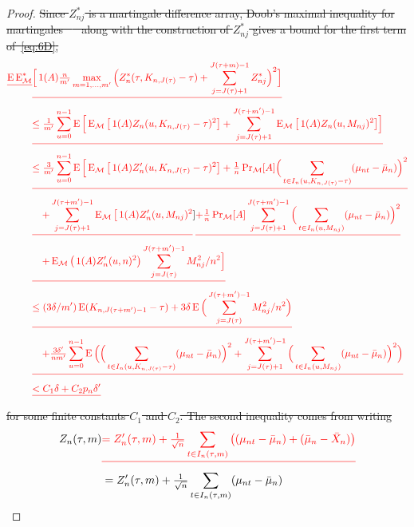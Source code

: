 \documentclass[11pt]{article}
\providecommand{\DIFadd}[1]{{\protect\color{blue}\uwave{#1}}} %
\providecommand{\DIFdel}[1]{{\protect\color{red}\sout{#1}}}                      %
\begin{document}
\begin{proof}
\DIFdel{Since $Z_{nj}^*$ is a martingale difference array, Doob's maximal
  inequality for martingales \mbox{%
\citep[see][Theorem 15.15, for
  example]{Dav:94} }%
along with the construction of $Z_{nj}^{*}$ gives
  a bound for the first term of~\eqref{eq:6D},}
  \begin{align*}
  \DIFdel{\E \Em^* }& \DIFdel{\Big[\ind(A) \tfrac{n}{m'}\max_{m = 1,\dots, m'}
  \Big(Z_n^*(\tau, K_{n,J(\tau)} - \tau)
  + \sum_{j=J(\tau)+1}^{J(\tau + m)-1} Z_{nj}^*\Big)^2\Big] }\\
  &\DIFdel{\leq \tfrac{1}{m'} \sum_{u = 0}^{n-1} \E \Big[\Em \big[
  \ind(A) Z_n(u, K_{n,J(\tau)} - \tau)^2\big] +
  \sum_{j=J(\tau)+1}^{J(\tau + m')-1} \Em \big[\ind(A) Z_n(u, M_{nj})^2\big]\Big] }\\
  &\DIFdel{\leq \tfrac{3}{m'} \sum_{u = 0}^{n-1} \E\Big[\Em\big[
  \ind(A) Z'_n(u, K_{n,J(\tau)} - \tau)^2\big]
  + \tfrac{1}{n} \Pm[A] \Big(\sum_{t \in I_n(u, K_{n,J(\tau)} - \tau)}
  (\mu_{nt} - \bar \mu_n)\Big)^2 }\\
  & \DIFdel{\quad+ \sum_{j=J(\tau)+1}^{J(\tau + m')-1}
  \Em \big[\ind(A) Z_n'(u, M_{nj})^2}]
  \DIFdel{+ \tfrac{1}{n} \Pm[A]
  \sum_{j=J(\tau)+1}^{J(\tau + m')-1}\Big( \sum_{t \in I_n(u,M_{nj})}
  (\mu_{nt} - \bar{\mu}_n) \Big)^2 }\\
  & \DIFdel{\quad+ \Em\big( \ind(A) Z_n'(u, n)^2 \big)
  \sum_{j=J(\tau)}^{J(\tau+m')-1} M_{nj}^2/n^2 \Big] }\\
  &\DIFdel{\leq (3\delta/m') \E (K_{n,J(\tau+m')-1} - \tau)
    + 3\delta \E\Big(\sum_{j=J(\tau)}^{J(\tau+m')-1} M_{nj}^2/n^2 \Big) }\\
  &\DIFdel{\quad+ \tfrac{3\delta'}{nm'} \sum_{u=0}^{n-1}\E\Big( \Big(\sum_{t \in I_n(u, K_{n,J(\tau)} - \tau)}
  (\mu_{nt} - \bar \mu_n)\Big)^2 +
  \sum_{j=J(\tau)+1}^{J(\tau + m')-1}\Big( \sum_{t \in I_n(u,M_{nj})}
  (\mu_{nt} - \bar{\mu}_n) \Big)^2 \Big) }\\
  & \DIFdel{< C_1 \delta + C_2 p_n \delta'
  }\end{align*}
  \DIFdel{for some finite constants $C_1$ and $C_2$. The second inequality comes from writing}
  \DIFadd{For~\eqref{eq:5}, use the equality}
  \begin{align}
    Z_n(\tau, m) &\DIFdel{= Z_n'(\tau, m)
    + \tfrac{1}{\sqrt{n}} \sum_{t \in I_n(\tau, m)}
    \big((\mu_{nt} - \bar \mu_n) + (\bar \mu_n - \bar X_n)\big) } \notag\\
    &= Z_n'(\tau, m)
    + \tfrac{1}{\sqrt{n}} \sum_{t \in I_n(\tau, m)} (\mu_{nt} - \bar \mu_n)

\end{align}
\end{proof}
\end{document}
